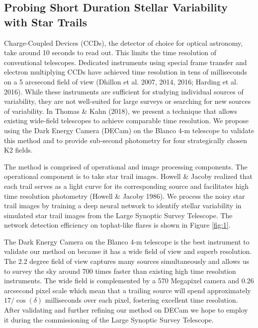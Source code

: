 \documentclass[11pt]{article}
\begin{document}

\subsection*{Probing Short Duration Stellar Variability with Star Trails}

 Charge-Coupled Devices (CCDs), the detector of choice for optical astronomy, take around 10 seconds to read out. This limits the time resolution of conventional telescopes. Dedicated instruments using special frame transfer and electron multiplying CCDs have achieved time resolution in tens of milliseconds on a 5 arcsecond field of view (Dhillon et al. 2007, 2014, 2016; Harding et al. 2016). While these instruments are sufficient for studying individual sources of variability, they are not well-suited for large surveys or searching for new sources of variability. In Thomas \& Kahn (2018), we present a technique that allows existing wide-field telescopes to achieve comparable time resolution. We propose using the Dark Energy Camera (DECam) on the Blanco 4-m telescope to validate this method and to provide sub-second photometry for four strategically chosen K2 fields.

The method is comprised of operational and image processing components. The operational component is to take star trail images. Howell \& Jacoby realized that each trail serves as a light curve for its corresponding source and facilitates high time resolution photometry (Howell \& Jacoby 1986). We process the noisy star trail images by training a deep neural network to identify stellar variability in simulated star trail images from the Large Synoptic Survey Telescope. The network detection efficiency on tophat-like flares is shown in Figure \ref{fig:1}. 

The Dark Energy Camera on the Blanco 4-m telescope is the best instrument to validate our method on because it has a wide field of view and superb resolution. The 2.2 degree field of view captures many sources simultaneously and allows us to survey the sky around 700 times faster than existing high time resolution instruments. The wide field is complemented by a 570 Megapixel camera and 0.26 arcsecond pixel scale which mean that a trailing source will spend approximately $17 / \cos(\delta)$ milliseconds over each pixel, fostering excellent time resolution. After validating and further refining our method on DECam we hope to employ it during the commissioning of the Large Synoptic Survey Telescope. 
\end{document}
